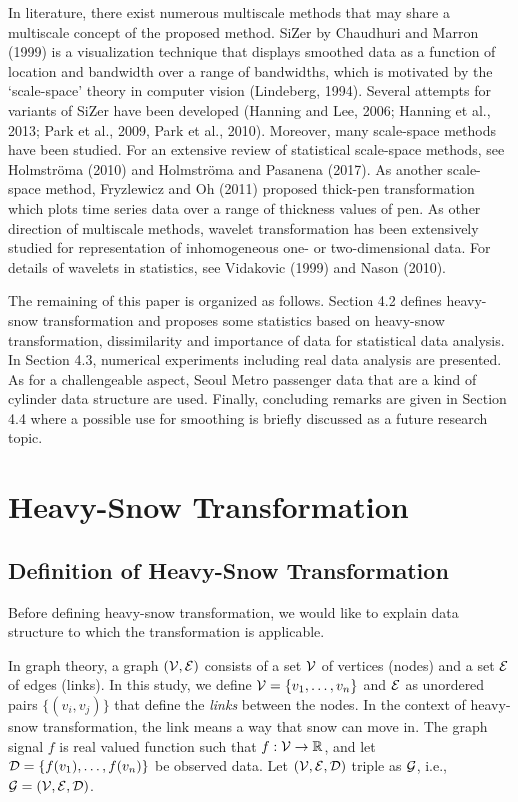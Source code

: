 \documentclass[preprint, review, 12pt]{article}
\theoremstyle{definition}
\theoremstyle{remark}
\begin{document}
In literature, there exist numerous multiscale methods that may share a multiscale concept of the proposed method. SiZer by Chaudhuri and Marron (1999) is a visualization technique that displays smoothed data as a function of location and bandwidth over a range of bandwidths, which is motivated by the `scale-space' theory in computer vision (Lindeberg, 1994). Several attempts for variants of SiZer have been developed (Hanning and Lee, 2006; Hanning et al., 2013; Park et al., 2009, Park et al., 2010). Moreover, many scale-space methods have been studied. For an extensive review of statistical scale-space methods, see Holmstr\"oma (2010) and Holmstr\"oma and Pasanena (2017). As another scale-space method, Fryzlewicz and Oh (2011) proposed thick-pen transformation which plots time series data over a range of thickness values of pen. As other direction of multiscale methods, wavelet transformation has been extensively studied for representation of inhomogeneous one- or two-dimensional data. For details of wavelets in statistics, see  Vidakovic (1999) and Nason (2010). 

The remaining of this paper is organized as follows. Section 4.2 defines heavy-snow transformation and proposes some statistics based on heavy-snow transformation, dissimilarity and importance of data for statistical data analysis. In Section 4.3, numerical experiments including real data analysis are presented. As for a challengeable aspect, Seoul Metro passenger data that are a kind of cylinder data structure are used. Finally, concluding remarks are given in Section 4.4 where a possible use for smoothing is briefly discussed as a future research topic. 
\fi 

\section{Heavy-Snow Transformation}
\subsection{Definition of Heavy-Snow Transformation}
Before defining heavy-snow transformation, we would like to explain data structure to which the transformation is applicable. 

In graph theory, a graph $({\cal V},{\cal E})$ consists of a set ${\cal V}$ of vertices (nodes) and a set ${\cal E}$ of edges (links). In this study, we define ${\cal V}=\{v_1,\dots,v_n\}$ and ${\cal E}$ as unordered pairs $\{(v_i,v_j)\}$ that define the {\it links} between the nodes. In the context of heavy-snow transformation, the link means a way that snow can move in. The graph signal $f$ is real valued function such that $f : {\cal V} \to \mathbb{R}$, and let ${\cal D}=\{f(v_1),\dots,f(v_n)\}$ be observed data. Let $({\cal V},{\cal E},{\cal D})$ triple as ${\cal G}$, i.e., ${\cal G}=({\cal V},{\cal E},{\cal D})$. 
\end{document}
